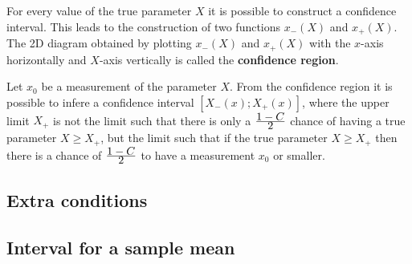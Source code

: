 {	For every value of the true parameter $X$ it is possible to construct a confidence interval. This leads to the construction of two functions $x_-(X)$ and $x_+(X)$. The 2D diagram obtained by plotting $x_-(X)$ and $x_+(X)$ with the $x$-axis horizontally and $X$-axis vertically is called the \textbf{confidence region}.
	\begin{method}
		Let $x_0$ be a measurement of the parameter $X$. From the confidence region it is possible to infere a confidence interval $[X_-(x);X_+(x)]$, where the upper limit $X_+$ is not the limit such that there is only a $\stylefrac{1-C}{2}$ chance of having a true parameter $X\geq X_+$, but the limit such that if the true parameter $X\geq X_+$ then there is a chance of $\stylefrac{1-C}{2}$ to have a measurement $x_0$ or smaller.
	\end{method}
    
\subsection{Extra conditions}
	
    
\subsection{Interval for a sample mean}
	
}
